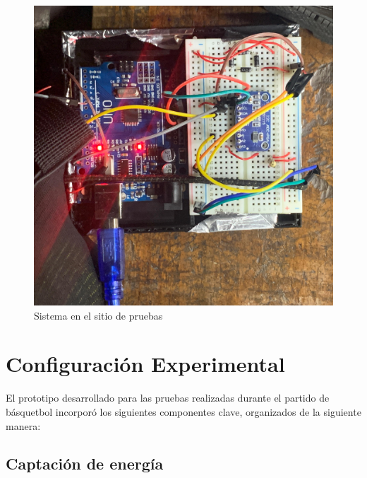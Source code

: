 \documentclass{article}
\begin{document}
\begin{figure}[H]
    \centering
    \includegraphics[width=0.5\linewidth]{piezopulse basquetbol.jpeg}
    \caption{Sistema en el sitio de pruebas}
    \label{fig:enter-label}
\end{figure}
\newpage


\section{Configuración Experimental}

El prototipo desarrollado para las pruebas realizadas durante el partido de básquetbol incorporó los siguientes componentes clave, organizados de la siguiente manera:

\subsection{Captación de energía}
\end{document}
